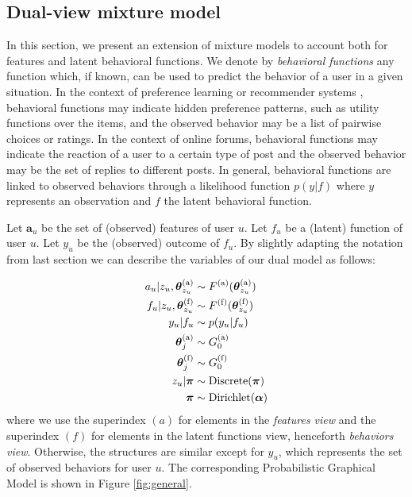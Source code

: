 \documentclass[smallextended]{svjour3}          %
\newcommand\alberto[1]{\textcolor{black}{#1}}
\begin{document}
\subsection{Dual-view mixture model}\label{sec:dual-view}
In this section, we present an extension of mixture models to account both for features and latent behavioral functions. We denote by \textit{behavioral functions} any function which, if known, can be used to predict the behavior of a user in a given situation. In the context of preference learning \citep{Bonilla2010,Abbasnejad2013a} or recommender systems \citep{Cheung2004}, behavioral functions may indicate hidden preference patterns, such as utility functions over the items,  and the observed behavior may be a list of pairwise choices or ratings. In the context of online forums, behavioral functions may indicate the reaction of a user to a certain type of post and the observed behavior may be the set of replies to different posts. In general, behavioral functions are linked to observed behaviors through a likelihood function $p(y | f)$ where $y$ represents an observation and $f$ the latent behavioral function. 

Let $\mathbf{a}_u$ be the set of (observed) features of user $u$. Let $f_u$ be a (latent) function of user $u$. Let $y_u$ be the (observed) outcome of $f_u$. By slightly adapting the notation from last section we can describe the variables of our dual model as follows: 

\begin{align}
a_u | z_u, \boldsymbol{\theta}_{z_u}^{\text{(a)}} &\sim F^{\text{(a)}}(\boldsymbol{\theta}_{z_u}^{\text{(a)}})\notag\\
f_u | z_u, \boldsymbol{\theta}_{z_u}^{\text{(f)}} &\sim F^{\text{(f)}}(\boldsymbol{\theta}_{z_u}^{\text{(f)}})\notag\\
y_u \alberto{| f_u} &\sim p(y_u | f_u)\notag\\
\boldsymbol{\theta}_j^{\text{(a)}} &\sim G_0^{\text{(a)}}\notag\\
\boldsymbol{\theta}_j^{\text{(f)}} &\sim G_0^{\text{(f)}}\notag\\
z_u \alberto{ | \boldsymbol{\pi}} &\sim \text{Discrete}(\boldsymbol{\pi})\notag\\
\boldsymbol{\pi} &\sim \text{Dirichlet}(\boldsymbol{\alpha})
\end{align}
where we use the superindex $(a)$ for elements in the \textit{features view} and the superindex $(f)$ for elements in the latent functions view, henceforth \textit{behaviors view}. Otherwise, the structures are  similar except for $y_u$, which represents the set of observed behaviors for user $u$. The corresponding Probabilistic Graphical Model is shown in Figure \ref{fig:general}.
\end{document}
